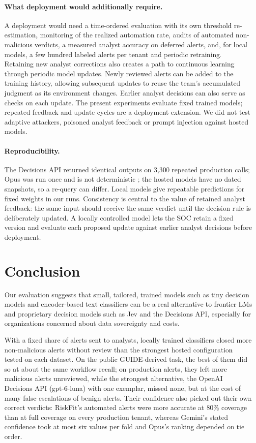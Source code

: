 \documentclass[letterpaper]{article} %
\begin{document}
\paragraph{What deployment would additionally require.} A deployment would need a time-ordered evaluation with its own threshold re-estimation, monitoring of the realized automation rate, audits of automated non-malicious verdicts, a measured analyst accuracy on deferred alerts, and, for local models, a few hundred labeled alerts per tenant and periodic retraining. Retaining new analyst corrections also creates a path to continuous learning through periodic model updates. Newly reviewed alerts can be added to the training history, allowing subsequent updates to reuse the team's accumulated judgment as its environment changes. Earlier analyst decisions can also serve as checks on each update. The present experiments evaluate fixed trained models; repeated feedback and update cycles are a deployment extension. We did not test adaptive attackers, poisoned analyst feedback or prompt injection against hosted models.

\paragraph{Reproducibility.} The Decisions API returned identical outputs on 3,300 repeated production calls; Opus was run once and is not deterministic \citep{atil2024nondeterminism}; the hosted models have no dated snapshots, so a re-query can differ. Local models give repeatable predictions for fixed weights in our runs. Consistency is central to the value of retained analyst feedback: the same input should receive the same verdict until the decision rule is deliberately updated. A locally controlled model lets the SOC retain a fixed version and evaluate each proposed update against earlier analyst decisions before deployment.

\section{Conclusion}

Our evaluation suggests that small, tailored, trained models such as tiny decision models and encoder-based text classifiers can be a real alternative to frontier LMs and proprietary decision models such as Jev and the Decisions API, especially for organizations concerned about data sovereignty and costs.

With a fixed share of alerts sent to analysts, locally trained classifiers closed more non-malicious alerts without review than the strongest hosted configuration tested on each dataset. On the public GUIDE-derived task, the best of them did so at about the same workflow recall; on production alerts, they left more malicious alerts unreviewed, while the strongest alternative, the OpenAI Decisions API (gpt-6-luna) with one exemplar, missed none, but at the cost of many false escalations of benign alerts. Their confidence also picked out their own correct verdicts: RiskFit's automated alerts were more accurate at 80\% coverage than at full coverage on every production tenant, whereas Gemini's stated confidence took at most six values per fold and Opus's ranking depended on tie order.
\end{document}
